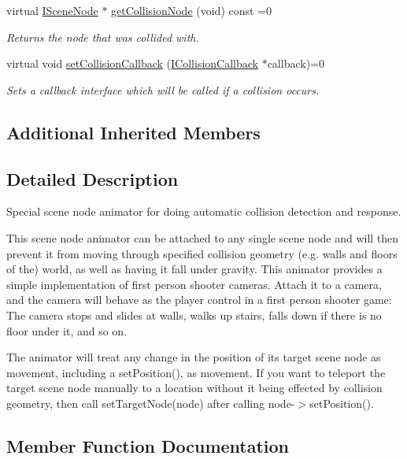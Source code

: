 \begin{DoxyCompactItemize}
virtual \hyperlink{classirr_1_1scene_1_1ISceneNode}{I\+Scene\+Node} $\ast$ \hyperlink{classirr_1_1scene_1_1ISceneNodeAnimatorCollisionResponse_a5a975ddf3d776d6bb4c6d44c36cc74fd}{get\+Collision\+Node} (void) const =0
\begin{DoxyCompactList}\small\item\em Returns the node that was collided with. \end{DoxyCompactList}\item 
virtual void \hyperlink{classirr_1_1scene_1_1ISceneNodeAnimatorCollisionResponse_a2b97f977b446200c5dd22230aec5d275}{set\+Collision\+Callback} (\hyperlink{classirr_1_1scene_1_1ICollisionCallback}{I\+Collision\+Callback} $\ast$callback)=0
\begin{DoxyCompactList}\small\item\em Sets a callback interface which will be called if a collision occurs. \end{DoxyCompactList}\end{DoxyCompactItemize}
\subsection*{Additional Inherited Members}


\subsection{Detailed Description}
Special scene node animator for doing automatic collision detection and response. 

This scene node animator can be attached to any single scene node and will then prevent it from moving through specified collision geometry (e.\+g. walls and floors of the) world, as well as having it fall under gravity. This animator provides a simple implementation of first person shooter cameras. Attach it to a camera, and the camera will behave as the player control in a first person shooter game\+: The camera stops and slides at walls, walks up stairs, falls down if there is no floor under it, and so on.

The animator will treat any change in the position of its target scene node as movement, including a set\+Position(), as movement. If you want to teleport the target scene node manually to a location without it being effected by collision geometry, then call set\+Target\+Node(node) after calling node-\/$>$set\+Position(). 

\subsection{Member Function Documentation}
\mbox{\label{classirr_1_1scene_1_1ISceneNodeAnimatorCollisionResponse_a788542083dda874c63e278891535a9f4}} 
